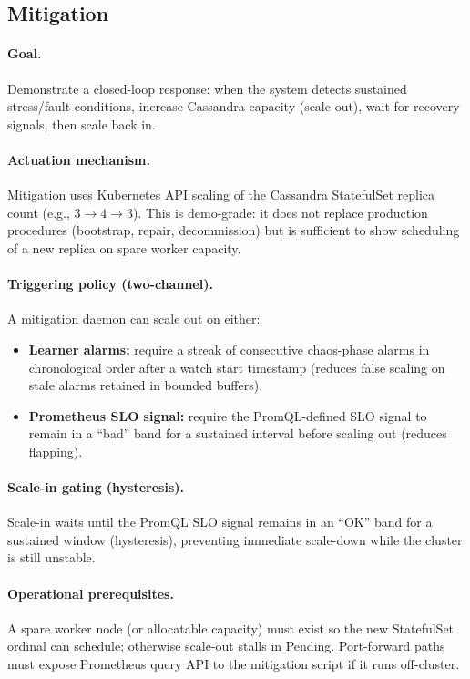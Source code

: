 \documentclass[11pt,a4paper]{article}
\begin{document}
\subsection{Mitigation}
\label{subsec:mitigation}

\paragraph{Goal.}
Demonstrate a closed-loop response: when the system detects sustained stress/fault conditions, increase Cassandra capacity (scale out), wait for recovery signals, then scale back in.

\paragraph{Actuation mechanism.}
Mitigation uses Kubernetes API scaling of the Cassandra StatefulSet replica count (e.g., $3 \rightarrow 4 \rightarrow 3$). This is demo-grade: it does not replace production procedures (bootstrap, repair, decommission) but is sufficient to show scheduling of a new replica on spare worker capacity.

\paragraph{Triggering policy (two-channel).}
A mitigation daemon can scale out on either:
\begin{itemize}[leftmargin=*]
  \item \textbf{Learner alarms:} require a streak of consecutive chaos-phase alarms in chronological order after a watch start timestamp (reduces false scaling on stale alarms retained in bounded buffers).
  \item \textbf{Prometheus SLO signal:} require the PromQL-defined SLO signal to remain in a ``bad'' band for a sustained interval before scaling out (reduces flapping).
\end{itemize}

\paragraph{Scale-in gating (hysteresis).}
Scale-in waits until the PromQL SLO signal remains in an ``OK'' band for a sustained window (hysteresis), preventing immediate scale-down while the cluster is still unstable.

\paragraph{Operational prerequisites.}
A spare worker node (or allocatable capacity) must exist so the new StatefulSet ordinal can schedule; otherwise scale-out stalls in Pending. Port-forward paths must expose Prometheus query API to the mitigation script if it runs off-cluster.
\end{document}
